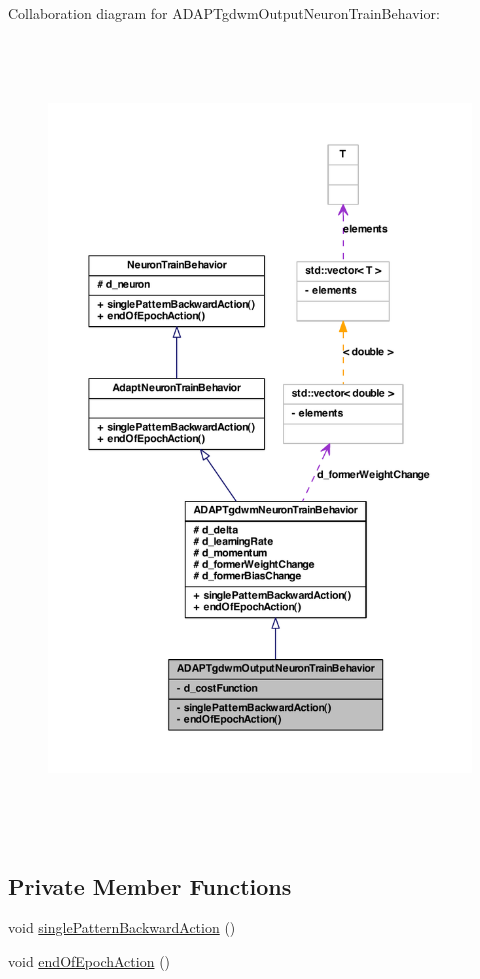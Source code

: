 Collaboration diagram for ADAPTgdwmOutputNeuronTrainBehavior:
\nopagebreak
\begin{figure}[H]
\begin{center}
\leavevmode
\includegraphics[height=600pt]{class_a_d_a_p_tgdwm_output_neuron_train_behavior__coll__graph}
\end{center}
\end{figure}
\subsection*{Private Member Functions}
\begin{DoxyCompactItemize}
\item 
void \hyperlink{class_a_d_a_p_tgdwm_output_neuron_train_behavior_a4bb0ec6e24b4e42df0fa985fe0a5d309}{singlePatternBackwardAction} ()
\item 
void \hyperlink{class_a_d_a_p_tgdwm_output_neuron_train_behavior_a1bafb52aa3c961a0cfba288a6044f880}{endOfEpochAction} ()
\end{DoxyCompactItemize}
